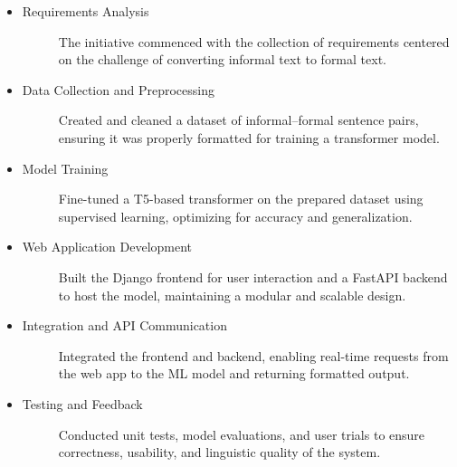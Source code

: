 \begin{itemize}
    
    \item \begin{description}
        \item[Requirements Analysis] The initiative commenced with the collection of requirements centered on the challenge of converting informal text to formal text.
    \end{description}
    \item \begin{description}
        \item[Data Collection and Preprocessing] Created and cleaned a dataset of informal–formal sentence pairs, ensuring it was properly formatted for training a transformer model.
    \end{description}
    \item \begin{description}
        \item[Model Training] Fine-tuned a T5-based transformer on the prepared dataset using supervised learning, optimizing for accuracy and generalization.
    \end{description}
    \item \begin{description}
        \item[Web Application Development] Built the Django frontend for user interaction and a FastAPI backend to host the model, maintaining a modular and scalable design.
    \end{description}
    \item \begin{description}
        \item[Integration and API Communication] Integrated the frontend and backend, enabling real-time requests from the web app to the ML model and returning formatted output.
    \end{description}
    \item \begin{description}
        \item[Testing and Feedback] Conducted unit tests, model evaluations, and user trials to ensure correctness, usability, and linguistic quality of the system.
    \end{description}
\end{itemize}

